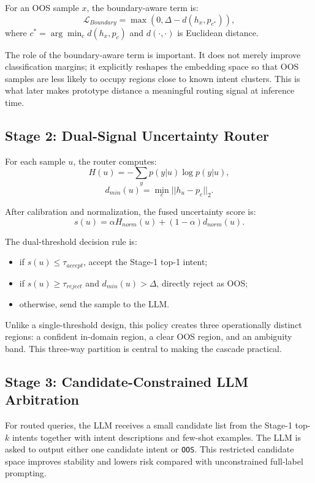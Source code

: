 \documentclass[11pt]{article}
\begin{document}
For an OOS sample $x$, the boundary-aware term is:
\begin{equation}
\mathcal{L}_{Boundary} = \max(0, \Delta - d(h_x, p_{c^*})),
\end{equation}
where $c^*=\arg\min_c d(h_x,p_c)$ and $d(\cdot,\cdot)$ is Euclidean distance.

The role of the boundary-aware term is important. It does not merely improve classification margins; it explicitly reshapes the embedding space so that OOS samples are less likely to occupy regions close to known intent clusters. This is what later makes prototype distance a meaningful routing signal at inference time.

\subsection{Stage 2: Dual-Signal Uncertainty Router}
For each sample $u$, the router computes:
\begin{equation}
H(u) = -\sum_y p(y|u)\log p(y|u),
\end{equation}
\begin{equation}
d_{min}(u)=\min_c ||h_u-p_c||_2.
\end{equation}

After calibration and normalization, the fused uncertainty score is:
\begin{equation}
s(u)=\alpha H_{norm}(u)+(1-\alpha)d_{norm}(u).
\end{equation}

The dual-threshold decision rule is:
\begin{itemize}
\item if $s(u)\le \tau_{accept}$, accept the Stage-1 top-1 intent;
\item if $s(u)\ge \tau_{reject}$ and $d_{min}(u)>\Delta$, directly reject as OOS;
\item otherwise, send the sample to the LLM.
\end{itemize}

Unlike a single-threshold design, this policy creates three operationally distinct regions: a confident in-domain region, a clear OOS region, and an ambiguity band. This three-way partition is central to making the cascade practical.

\subsection{Stage 3: Candidate-Constrained LLM Arbitration}
For routed queries, the LLM receives a small candidate list from the Stage-1 top-$k$ intents together with intent descriptions and few-shot examples. The LLM is asked to output either one candidate intent or \texttt{OOS}. This restricted candidate space improves stability and lowers risk compared with unconstrained full-label prompting.
\end{document}
